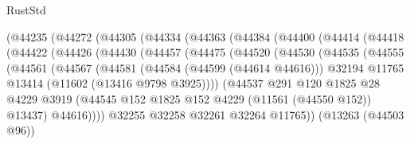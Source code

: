 \begin{lexlean}{RustStd}
\begin{coremodule}
                (@44235
                  (@44272
                    (@44305
                      (@44334
                        (@44363
                          (@44384
                            (@44400
                              (@44414
                                (@44418
                                  (@44422
                                    (@44426
                                      (@44430
                                        (@44457
                                          (@44475
                                            (@44520
                                              (@44530
                                                (@44535
                                                  (@44555
                                                    (@44561
                                                      (@44567
                                                        (@44581
                                                          (@44584 (@44599 (@44614 @44616)))
                                                          @32194
                                                          @11765
                                                          @13414
                                                          (@11602 (@13416 @9798 @3925))))
                                                      (@44537
                                                        @291
                                                        @120
                                                        @1825
                                                        @28
                                                        @4229
                                                        @3919
                                                        (@44545
                                                          @152
                                                          @1825
                                                          @152
                                                          @4229
                                                          (@11561 (@44550 @152))
                                                          @13437)
                                                        @44616))))
                                                @32255
                                                @32258
                                                @32261
                                                @32264
                                                @11765))
                                            (@13263 (@44503 @96))

\end{coremodule}
\end{lexlean}
